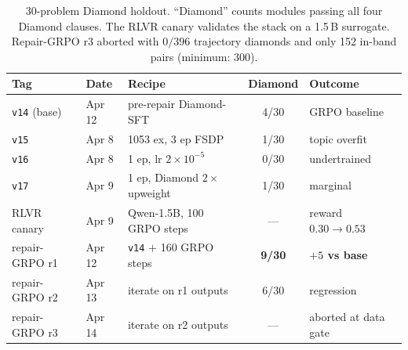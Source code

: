 \documentclass[11pt]{article}
\begin{document}
\begin{table}[t]
\centering
\small
\setlength{\tabcolsep}{4pt}
\begin{tabular}{@{}lllcl@{}}
\toprule
Tag & Date & Recipe & Diamond & Outcome \\
\midrule
\texttt{v14} (base) & Apr 12 & pre-repair Diamond-SFT
  & 4/30 & GRPO baseline \\
\texttt{v15} & Apr 8 & 1053 ex, 3 ep FSDP
  & 1/30 & topic overfit \\
\texttt{v16} & Apr 8 & 1 ep, lr $2{\times}10^{-5}$
  & 0/30 & undertrained \\
\texttt{v17} & Apr 9 & 1 ep, Diamond $2\times$ upweight
  & 1/30 & marginal \\
\midrule
RLVR canary & Apr 9 & Qwen-1.5B, 100 GRPO steps
  & --- & reward $0.30{\to}0.53$ \\
repair-GRPO r1 & Apr 12 & \texttt{v14} $+$ 160 GRPO steps
  & \textbf{9/30} & \textbf{$+5$ vs base} \\
repair-GRPO r2 & Apr 13 & iterate on r1 outputs
  & 6/30 & regression \\
repair-GRPO r3 & Apr 14 & iterate on r2 outputs
  & --- & aborted at data gate \\
\bottomrule
\end{tabular}
\caption{30-problem Diamond holdout.  ``Diamond'' counts modules
passing all four Diamond clauses.  The RLVR canary validates the
stack on a 1.5\,B surrogate.  Repair-GRPO r3 aborted with $0/396$
trajectory diamonds and only 152 in-band pairs (minimum: 300).}
\label{tab:diamond-history}
\end{table}
\end{document}
